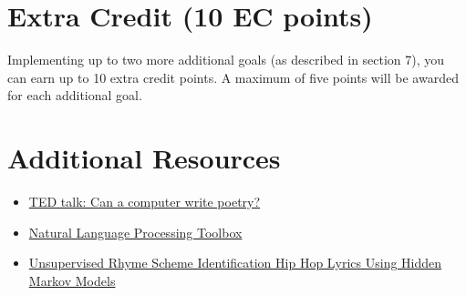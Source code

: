 \section{Extra Credit (10 EC points)}
Implementing up to two more additional goals (as described in section 7), you can earn up to 10 extra credit points. A maximum of five points will be awarded for each additional goal.

\section{Additional Resources}
\begin{itemize}
    \item \href{https://www.ted.com/talks/oscar_schwartz_can_a_computer_write_poetry?language=en}{TED talk: Can a computer write poetry?}
    \item \href{http://www.nltk.org/}{Natural Language Processing Toolbox}
    \item \href{http://link.springer.com/chapter/10.1007%2F978-3-642-39593-2_3}{Unsupervised Rhyme Scheme Identification Hip Hop Lyrics Using Hidden Markov Models}
\end{itemize}

